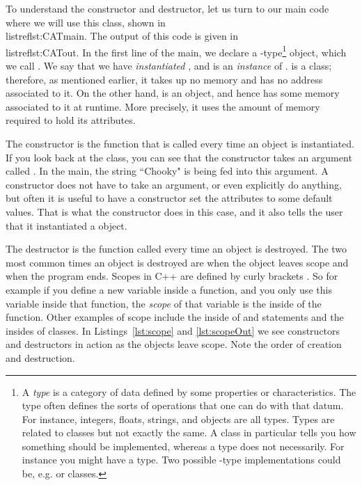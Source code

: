 To understand the constructor and destructor, let us turn to our main
code where we will use this class, shown
in \\listref{lst:CATmain}. The output of this code is
given in \\listref{lst:CATout}. In the first line of
the main, we declare a
-type\footnote{A {\it type} is a category of data
defined by some properties or characteristics. The type often defines the sorts
of operations that one can do with that datum. For instance, integers, floats,
strings, and objects are all types. Types are related to classes but not exactly
the same. A class in particular tells you how something should be implemented,
whereas a type does not necessarily. For instance you might have a 
type. Two possible -type implementations could be, e.g.
 or  classes.} object, which we call . 
We say that we have
{\it instantiated} , and  is an {\it instance}
of .  is a class; therefore, as mentioned
earlier, it takes up no memory and has no address associated to it.
On the other hand,  is an object, and hence has some
memory associated to it at runtime. More precisely, it uses the
amount of memory required to hold its attributes.

The constructor is the function that is called every time an object is
instantiated. If you look back at the  class, you can see that
the constructor takes an argument called . In the main,
the string ``Chooky" is being fed into this argument. A constructor does
not have to take an argument, or even explicitly do anything, but often
it is useful to have a constructor set the attributes to some default values.
That is what the constructor does in this case, and it also tells the
user that it instantiated a  object.

\begin{code*}
\caption{Resulting output from main C++ code of \\listref{lst:CATmain}.
This output reflects some of the automatic actions taken when 
classes are instantiated and destroyed.}
\label{lst:CATout}
\end{code*}

The destructor is the function called every time an object is destroyed.
The two most common times an object is destroyed are when the object
leaves scope and when the program ends. Scopes in C++ are defined by
curly brackets \ff{\{\}}. So for example if you define a new variable
inside a function, and you only use this variable inside that function,
the {\it scope} of that variable is the inside of the function. 
Other examples of scope include
the inside of  and  statements and the
insides of classes. In Listings~\ref{lst:scope} and \ref{lst:scopeOut}
we see constructors and destructors in action as the objects
leave scope. Note the order of creation 
and destruction.


